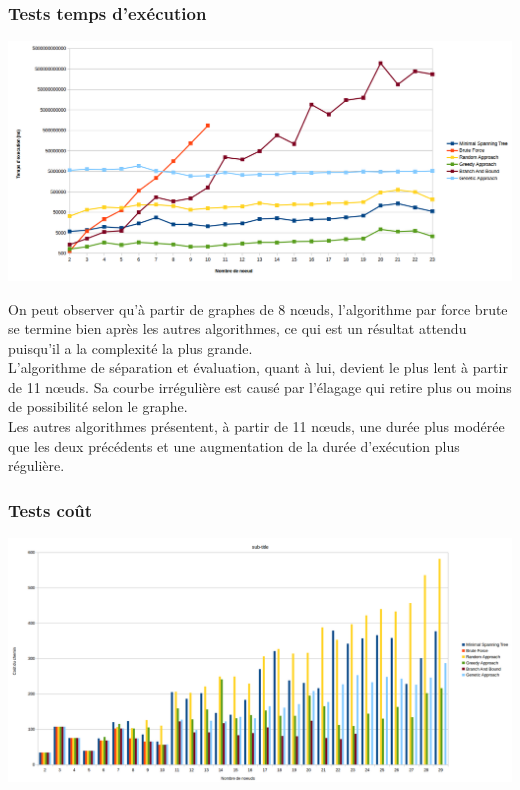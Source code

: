 \documentclass[10pt,a4paper]{report}
\begin{document}
		\subsubsection{Tests temps d'exécution}
			\includegraphics[scale=0.45]{./Ressource/temps_graphes_random.png}
			
			\begin{flushleft}
			On peut observer qu'à partir de graphes de 8 nœuds, l'algorithme par force brute se termine bien après les autres algorithmes, ce qui est un résultat attendu puisqu'il a la complexité la plus grande.\\
			L'algorithme de séparation et évaluation, quant à lui, devient le plus lent à partir de 11 nœuds. Sa courbe irrégulière est causé par l'élagage qui retire plus ou moins de possibilité selon le graphe.\\
			Les autres algorithmes présentent, à partir de 11 nœuds, une durée plus modérée que les deux précédents et une augmentation de la durée d'exécution plus régulière.
			\end{flushleft}
		
		\subsubsection{Tests coût}
			
			\includegraphics[scale=0.40]{./Ressource/cout_graphes_random.png}
			
\end{document}
